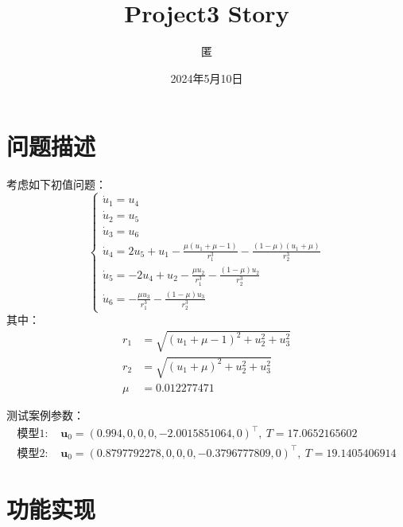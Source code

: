 \documentclass[a4paper]{ctexart} %
\title{Project3 Story}
\author{匿}
\date{2024年5月10日}
\begin{document}
\maketitle

\pagestyle{empty}

\section{问题描述}
考虑如下初值问题：
\begin{equation*}
\begin{cases}
    \dot{u}_1 = u_4 \\
    \dot{u}_2 = u_5 \\ 
    \dot{u}_3 = u_6 \\
    \dot{u}_4 = 2u_5 + u_1 - \frac{\mu(u_1+\mu-1)}{r_1^3} - \frac{(1-\mu)(u_1+\mu)}{r_2^3} \\
    \dot{u}_5 = -2u_4 + u_2 - \frac{\mu u_2}{r_1^3} - \frac{(1-\mu)u_2}{r_2^3} \\
    \dot{u}_6 = -\frac{\mu u_3}{r_1^3} - \frac{(1-\mu)u_3}{r_2^3}
\end{cases}
\end{equation*}
其中：
\begin{align*}
    r_1 &= \sqrt{(u_1+\mu-1)^2 + u_2^2 + u_3^2} \\
    r_2 &= \sqrt{(u_1+\mu)^2 + u_2^2 + u_3^2} \\
    \mu &= 0.012277471
\end{align*}

测试案例参数：
\begin{align*}
    \text{模型1: } & \mathbf{u}_0 = (0.994,0,0,0,-2.0015851064,0)^\top,\ T=17.0652165602 \\
    \text{模型2: } & \mathbf{u}_0 = (0.8797792278,0,0,0,-0.3796777809,0)^\top,\ T=19.1405406914
\end{align*}

\section{功能实现}
\end{document}
